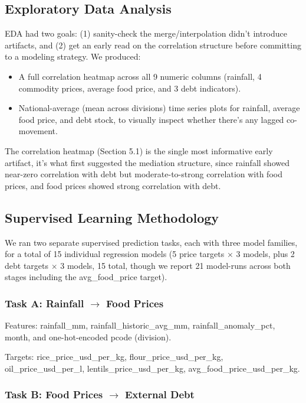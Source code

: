 \documentclass[12pt,a4paper]{article}
\begin{document}
\subsection{Exploratory Data Analysis}

EDA had two goals: (1) sanity-check the merge/interpolation didn't introduce artifacts, and (2) get an early read on the correlation structure before committing to a modeling strategy. We produced:
\begin{itemize}[leftmargin=2em]
  \item A full correlation heatmap across all 9 numeric columns (rainfall, 4 commodity prices, average food price, and 3 debt indicators).
  \item National-average (mean across divisions) time series plots for rainfall, average food price, and debt stock, to visually inspect whether there's any lagged co-movement.
\end{itemize}

The correlation heatmap (Section 5.1) is the single most informative early artifact, it's what first suggested the mediation structure, since rainfall showed near-zero correlation with debt but moderate-to-strong correlation with food prices, and food prices showed strong correlation with debt.


\subsection{Supervised Learning Methodology}

We ran two separate supervised prediction tasks, each with three model families, for a total of 15 individual regression models (5 price targets $\times$ 3 models, plus 2 debt targets $\times$ 3 models, 15 total, though we report 21 model-runs across both stages including the avg\_food\_price target).
\subsubsection{Task A: Rainfall $\rightarrow$ Food Prices}

Features: rainfall\_mm, rainfall\_historic\_avg\_mm, rainfall\_anomaly\_pct, month, and one-hot-encoded pcode (division).

Targets: rice\_price\_usd\_per\_kg, flour\_price\_usd\_per\_kg, oil\_price\_usd\_per\_l, lentils\_price\_usd\_per\_kg, avg\_food\_price\_usd\_per\_kg.
\subsubsection{Task B: Food Prices $\rightarrow$ External Debt}
\end{document}
